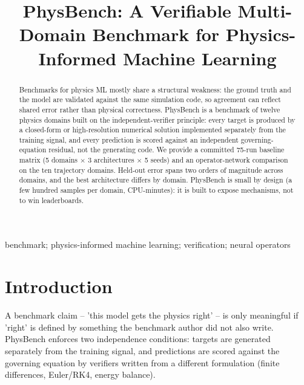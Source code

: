 \documentclass[conference,10pt]{IEEEtran}
\begin{document}
\title{PhysBench: A Verifiable Multi-Domain Benchmark for Physics-Informed Machine Learning}

\author{
}

\maketitle

\begin{abstract}
Benchmarks for physics ML mostly share a structural weakness: the ground truth and the model are validated against the same simulation code, so agreement can reflect shared error rather than physical correctness. PhysBench is a benchmark of twelve physics domains built on the independent-verifier principle: every target is produced by a closed-form or high-resolution numerical solution implemented separately from the training signal, and every prediction is scored against an independent governing-equation residual, not the generating code. We provide a committed 75-run baseline matrix (5 domains $\times$ 3 architectures $\times$ 5 seeds) and an operator-network comparison on the ten trajectory domains. Held-out error spans two orders of magnitude across domains, and the best architecture differs by domain. PhysBench is small by design (a few hundred samples per domain, CPU-minutes): it is built to expose mechanisms, not to win leaderboards.
\end{abstract}

\begin{IEEEkeywords}
benchmark; physics-informed machine learning; verification; neural operators
\end{IEEEkeywords}

\section{Introduction}
A benchmark claim -- 'this model gets the physics right' -- is only meaningful if 'right' is defined by something the benchmark author did not also write. PhysBench enforces two independence conditions: targets are generated separately from the training signal, and predictions are scored against the governing equation by verifiers written from a different formulation (finite differences, Euler/RK4, energy balance).
\end{document}
